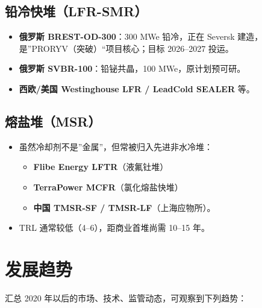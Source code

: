 \documentclass[
  UTF8,
  scheme=plain,
  fontsize=10pt,
  openany
]{ctexbook}
\begin{document}
\subsection{铅冷快堆（LFR-SMR）}\label{ux94c5ux51b7ux5febux5806lfr-smr}

\begin{itemize}
\tightlist
\item
  \textbf{俄罗斯 BREST-OD-300}：300 MWe 铅冷，正在 Seversk
  建造，是''PRORYV（突破）``项目核心；目标 2026--2027 投运。
\item
  \textbf{俄罗斯 SVBR-100}：铅铋共晶，100 MWe，原计划预可研。
\item
  \textbf{西欧/美国 Westinghouse LFR / LeadCold SEALER} 等。
\end{itemize}

\subsection{熔盐堆（MSR）}\label{ux7194ux76d0ux5806msr}

\begin{itemize}
\tightlist
\item
  虽然冷却剂不是''金属''，但常被归入先进非水冷堆：

  \begin{itemize}
  \tightlist
  \item
    \textbf{Flibe Energy LFTR}（液氟钍堆）
  \item
    \textbf{TerraPower MCFR}（氯化熔盐快堆）
  \item
    \textbf{中国 TMSR-SF / TMSR-LF}（上海应物所）。
  \end{itemize}
\item
  TRL 通常较低（4--6），距商业首堆尚需 10--15 年。
\end{itemize}

\section{发展趋势}\label{ux53d1ux5c55ux8d8bux52bf}

汇总 2020 年以后的市场、技术、监管动态，可观察到下列趋势：
\end{document}
